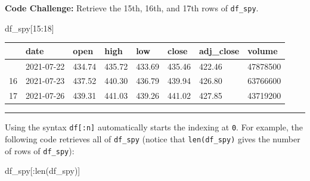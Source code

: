\documentclass[
  letterpaper,
  DIV=11,
  numbers=noendperiod]{scrreprt}
\newenvironment{Shaded}{\begin{snugshade}}{\end{snugshade}}
\newcommand{\BuiltInTok}[1]{\textcolor[rgb]{0.00,0.23,0.31}{#1}}
\newcommand{\DecValTok}[1]{\textcolor[rgb]{0.68,0.00,0.00}{#1}}
\newcommand{\NormalTok}[1]{\textcolor[rgb]{0.00,0.23,0.31}{#1}}
\begin{document}
\textbf{Code Challenge:} Retrieve the 15th, 16th, and 17th rows of
\texttt{df\_spy}.

\begin{Shaded}
\begin{Highlighting}[]
\NormalTok{df\_spy[}\DecValTok{15}\NormalTok{:}\DecValTok{18}\NormalTok{]}
\end{Highlighting}
\end{Shaded}

\begin{longtable}[]{@{}llllllll@{}}
\toprule\noalign{}
& date & open & high & low & close & adj\_close & volume \\
\midrule\noalign{}
\endhead
\bottomrule\noalign{}
\endlastfoot
15 & 2021-07-22 & 434.74 & 435.72 & 433.69 & 435.46 & 422.46 &
47878500 \\
16 & 2021-07-23 & 437.52 & 440.30 & 436.79 & 439.94 & 426.80 &
63766600 \\
17 & 2021-07-26 & 439.31 & 441.03 & 439.26 & 441.02 & 427.85 &
43719200 \\
\end{longtable}

\begin{center}\rule{0.5\linewidth}{0.5pt}\end{center}

Using the syntax \texttt{df{[}:n{]}} automatically starts the indexing
at \texttt{0}. For example, the following code retrieves all of
\texttt{df\_spy} (notice that \texttt{len(df\_spy)} gives the number of
rows of \texttt{df\_spy}):

\begin{Shaded}
\begin{Highlighting}[]
\NormalTok{df\_spy[:}\BuiltInTok{len}\NormalTok{(df\_spy)]}
\end{Highlighting}
\end{Shaded}
\end{document}
